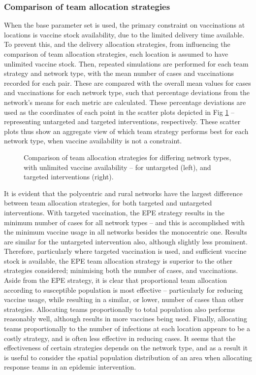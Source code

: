 \documentclass[10pt,letterpaper]{article}
\begin{document}
\subsubsection*{Comparison of team allocation strategies}
When the base parameter set is used, the primary constraint on vaccinations at locations is vaccine stock availability, due to the limited delivery time available. To prevent this, and the delivery allocation strategies, from influencing the comparison of team allocation strategies, each location is assumed to have unlimited vaccine stock. Then, repeated simulations are performed for each team strategy and network type, with the mean number of cases and vaccinations recorded for each pair. These are compared with the overall mean values for cases and vaccinations for each network type, such that percentage deviations from the network's means for each metric are calculated. These percentage deviations are used as the coordinates of each point in the scatter plots depicted in Fig \ref{fig:team_uncapped} -- representing untargeted and targeted interventions, respectively. These scatter plots thus show an aggregate view of which team strategy performs best for each network type, when vaccine availability is not a constraint.

\begin{figure}[ht!]
    \caption{Comparison of team allocation strategies for differing network types, with unlimited vaccine availability -- for untargeted (left), and targeted interventions (right).}
  \label{fig:team_uncapped}
\end{figure}

It is evident that the polycentric and rural networks have the largest difference between team allocation strategies, for both targeted and untargeted interventions. With targeted vaccination, the EPE strategy results in the minimum number of cases for all network types -- and this is accomplished with the minimum vaccine usage in all networks besides the monocentric one. Results are similar for the untargeted intervention also, although slightly less prominent. Therefore, particularly where targeted vaccination is used, and sufficient vaccine stock is available, the EPE team allocation strategy is superior to the other strategies considered; minimising both the number of cases, and vaccinations.
Aside from the EPE strategy, it is clear that proportional team allocation according to susceptible population is most effective -- particularly for reducing vaccine usage, while resulting in a similar, or lower, number of cases than other strategies. Allocating teams proportionally to total population also performs reasonably well, although results in more vaccines being used. Finally, allocating teams proportionally to the number of infections at each location appears to be a costly strategy, and is often less effective in reducing cases. It seems that the effectiveness of certain strategies depends on the network type, and as a result it is useful to consider the spatial population distribution of an area when allocating response teams in an epidemic intervention.
\end{document}
